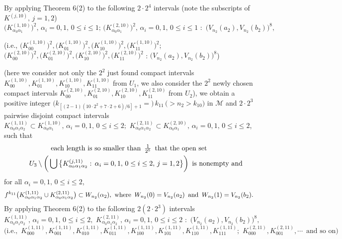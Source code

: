 \documentclass[12pt]{article}
\newcommand{\al}{\alpha}
\begin{document}
By applying Theorem 6(2) to the following $2 \cdot 2^4$ intervals \big(note the subscripts of $K^{(j,10)}, \, j= 1, 2$\big) 
$$
\big(K_{\al_0\al_1}^{(1,10)}\big)^2, \, \al_i = 0, 1, \, 0 \le i \le 1; \, \big(K_{\al_0\al_1}^{(2,10)}\big)^2, \, \al_i = 0, 1, \, 0 \le i \le 1 \,\, : \,\, \big(V_{n_2}(a_2), V_{n_2}(b_2)\big)^8,
$$
\begin{footnotesize}
\big(i.e., $\big(K_{00}^{(1,10)}\big)^2, \big(K_{01}^{(1,10)}\big)^2, \big(K_{10}^{(1,10)}\big)^2, \big(K_{11}^{(1,10)}\big)^2$; $\big(K_{00}^{(2,10)}\big)^2, \big(K_{01}^{(2,10)}\big)^2, \big(K_{10}^{(2,10)}\big)^2, \big(K_{11}^{(2,10)}\big)^2$ : $\big(V_{n_2}(a_2), V_{n_2}(b_2)\big)^8$\big)
\end{footnotesize}
\big(here we consider not only the $2^2$ just found compact intervals $K_{00}^{(1,10)}, K_{01}^{(1,10)}, K_{10}^{(1,10)}, K_{11}^{(1,10)}$ from $U_1$, we also consider the $2^2$ newly chosen compact intervals $K_{00}^{(2,10)}, K_{01}^{(2,10)}, K_{10}^{(2,10)}, K_{11}^{(2,10)}$ from $U_2$\big), we obtain a positive integer $\big(k_{[(2-1)(10 \cdot 2^2+7 \cdot 2+6)/6]+1} =) \, k_{11} \, (> n_2 > k_{10}\big)$ in $\mathcal M$ and $2 \cdot 2^3$ pairwise disjoint compact intervals $K_{\al_0\al_1\al_2}^{(1,11)} \subset K_{\al_0\al_1}^{(1,10)}, \, \al_i = 0, 1, \, 0 \le i \le 2; \,\, K_{\al_0\al_1\al_2}^{(2,11)} \subset K_{\al_0\al_1}^{(2,10)}, \, \al_i = 0, 1, \, 0 \le i \le 2$, such that 
{\large 
\begin{multline*}
$$
\text{each length is so smaller than} \,\,\, \frac 1{2^5} \,\,\, \text{that the open set} \\  
\qquad U_3 \setminus \bigg( \bigcup \big\{ K_{\al_0\al_1\al_2}^{(j,11)}: \, \al_i = 0, 1, \, 0 \le i \le 2, \, j = 1, 2 \big\} \bigg) \,\,\, \text{is nonempty and}
$$
\end{multline*}}
\noindent for all $\al_i = 0, 1, \, 0 \le i \le 2$, 
$$
f^{k_{11}}\big(K_{\al_0\al_1\al_2}^{(1,11)} \cup K_{\al_0\al_1\al_2}^{(2,11)}\big) \subset W_{n_2}(\al_2), \,\, \text{where} \,\,\, W_{n_2}(0) = V_{n_2}(a_2) \,\,\, \text{and} \,\,\, W_{n_2}(1) = V_{n_2}(b_2).\vspace{.1in}
$$
\indent By applying Theorem 6(2) to the following $2(2 \cdot 2^3)$ intervals 
$$
K_{\al_0\al_1\al_2}^{(1,11)}, \, \al_i = 0, 1, \, 0 \le i \le 2, \,\, K_{\al_0\al_1\al_2}^{(2,11)}, \, \al_i = 0, 1, \, 0 \le i \le 2 \,\, : \,\, \big(V_{n_2}(a_2), V_{n_2}(b_2)\big)^8,
$$
$$
\big(\text{i.e.,} \,\,\, K_{000}^{(1,11)}, K_{001}^{(1,11)}, K_{010}^{(1,11)}, K_{011}^{(1,11)}, K_{100}^{(1,11)}, K_{101}^{(1,11)}, K_{110}^{(1,11)}, K_{111}^{(1,11)}; \,\, K_{000}^{(2,11)}, K_{001}^{(2,11)}, \cdots \,\,\, \text{and so on}\big)
$$
\end{document}
